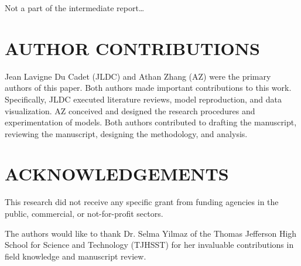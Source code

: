\documentclass[12pt]{article}
\begin{document}
Not a part of the intermediate report…

\section{AUTHOR CONTRIBUTIONS}

Jean Lavigne Du Cadet (JLDC) and Athan Zhang (AZ) were the primary authors of this paper. Both authors made important contributions to this work. Specifically, JLDC executed literature reviews, model reproduction, and data visualization. AZ conceived and designed the research procedures and experimentation of models. Both authors contributed to drafting the manuscript, reviewing the manuscript, designing the methodology, and analysis.

\section{ACKNOWLEDGEMENTS}

This research did not receive any specific grant from funding agencies in the public, commercial, or not-for-profit sectors. 

The authors would like to thank Dr. Selma Yilmaz of the Thomas Jefferson High School for Science and Technology (TJHSST) for her invaluable contributions in field knowledge and manuscript review.



\end{document}
